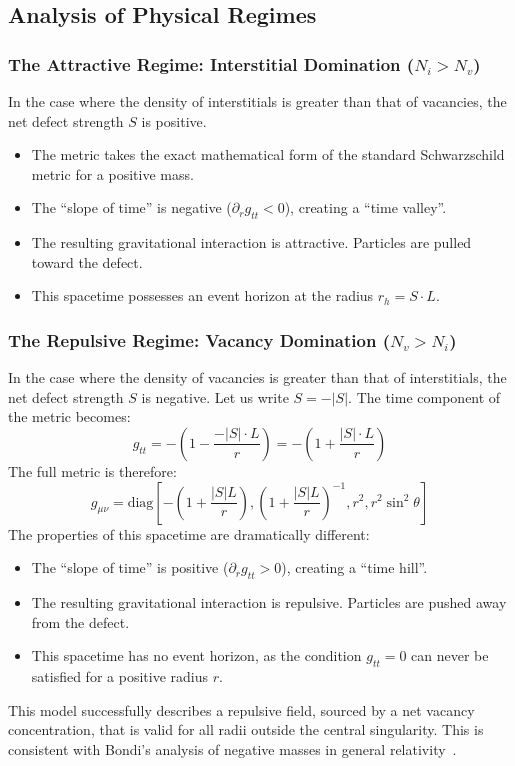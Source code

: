 \documentclass[%
  reprint,
  superscriptaddress,
  showpacs,
  showkeys,
  amsmath,amssymb,
  pra,
  longbibliography,
  floatfix,
]{revtex4-2}
\begin{document}
\subsection{Analysis of Physical Regimes}

\subsubsection{The Attractive Regime: Interstitial Domination ($N_i > N_v$)}

In the case where the density of interstitials is greater than that of vacancies, the net defect strength $S$ is positive.
\begin{itemize}
    \item The metric takes the exact mathematical form of the standard Schwarzschild metric for a positive mass.
    \item The ``slope of time'' is negative ($\partial_r g_{tt} < 0$), creating a ``time valley''.
    \item {The resulting gravitational interaction is attractive.} Particles are pulled toward the defect.
    \item This spacetime possesses an event horizon at the radius $r_h = S \cdot L$.
\end{itemize}

\subsubsection{The Repulsive Regime: Vacancy Domination ($N_v > N_i$)}

In the case where the density of vacancies is greater than that of interstitials, the net defect strength $S$ is negative. Let us write $S = -|S|$. The time component of the metric becomes:
\begin{equation}
g_{tt} = -\left(1 - \frac{-|S| \cdot L}{r}\right) = -\left(1 + \frac{|S| \cdot L}{r}\right)
\end{equation}
The full metric is therefore:
\begin{equation}
g_{\mu\nu} = \text{diag}\left[-\left(1 + \frac{|S|L}{r}\right), \left(1 + \frac{|S|L}{r}\right)^{-1}, r^2, r^2 \sin^2 \theta\right]
\end{equation}
The properties of this spacetime are dramatically different:
\begin{itemize}
    \item The ``slope of time'' is positive ($\partial_r g_{tt} > 0$), creating a ``time hill''.
    \item The resulting gravitational interaction is repulsive. Particles are pushed away from the defect.
    \item This spacetime has {no event horizon}, as the condition $g_{tt}=0$ can never be satisfied for a positive radius $r$.
\end{itemize}
This model successfully describes a repulsive field, sourced by a net vacancy concentration,
that is valid for all radii outside the central singularity.
This is consistent with Bondi's analysis of negative masses in general relativity~\cite{bondi-1957}.
\end{document}
